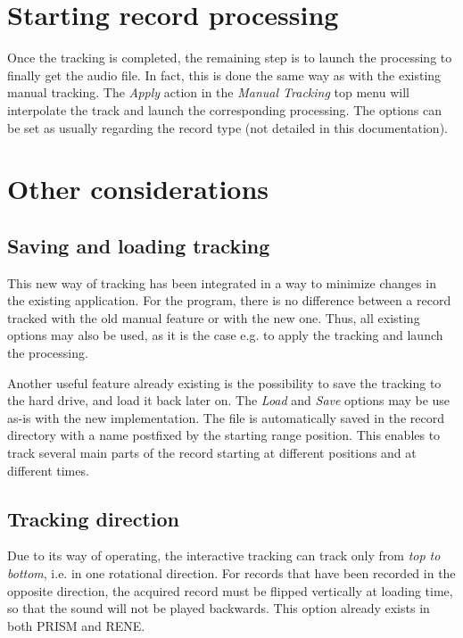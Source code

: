\section{Starting record processing}

Once the tracking is completed, the remaining step is to launch the processing to finally get the audio file. In fact, this is done the same way as with the existing manual tracking. The \emph{Apply} action in the \emph{Manual Tracking} top menu will interpolate the track and launch the corresponding processing. The options can be set as usually regarding the record type (not detailed in this documentation).

\section{Other considerations}

\subsection{Saving and loading tracking}

This new way of tracking has been integrated in a way to minimize changes in the existing application. For the program, there is no difference between a record tracked with the old manual feature or with the new one. Thus, all existing options may also be used, as it is the case e.g. to apply the tracking and launch the processing.

Another useful feature already existing is the possibility to save the tracking to the hard drive, and load it back later on. The \emph{Load} and \emph{Save} options may be use as-is with the new implementation. The file is automatically saved in the record directory with a name postfixed by the starting range position. This enables to track several main parts of the record starting at different positions and at different times.

\subsection{Tracking direction}

Due to its way of operating, the interactive tracking can track only from \emph{top to bottom}, i.e. in one rotational direction. For records that have been recorded in the opposite direction, the acquired record must be flipped vertically at loading time, so that the sound will not be played backwards. This option already exists in both PRISM and RENE.

